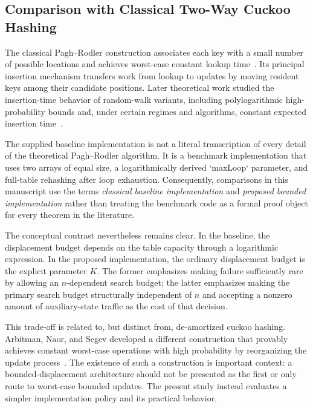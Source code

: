 \documentclass[conference]{IEEEtran}
\begin{document}
\subsection{Comparison with Classical Two-Way Cuckoo Hashing}

The classical Pagh--Rodler construction associates each key with a small number of possible locations and achieves worst-case constant lookup time~\cite{pagh2004cuckoo}. Its principal insertion mechanism transfers work from lookup to updates by moving resident keys among their candidate positions. Later theoretical work studied the insertion-time behavior of random-walk variants, including polylogarithmic high-probability bounds and, under certain regimes and algorithms, constant expected insertion time~\cite{fountoulakis2010insertion,walzer2022insertion,bell2024constant}.

The supplied baseline implementation is not a literal transcription of every detail of the theoretical Pagh--Rodler algorithm. It is a benchmark implementation that uses two arrays of equal size, a logarithmically derived `maxLoop` parameter, and full-table rehashing after loop exhaustion. Consequently, comparisons in this manuscript use the terms \emph{classical baseline implementation} and \emph{proposed bounded implementation} rather than treating the benchmark code as a formal proof object for every theorem in the literature.

The conceptual contrast nevertheless remains clear. In the baseline, the displacement budget depends on the table capacity through a logarithmic expression. In the proposed implementation, the ordinary displacement budget is the explicit parameter $K$. The former emphasizes making failure sufficiently rare by allowing an $n$-dependent search budget; the latter emphasizes making the primary search budget structurally independent of $n$ and accepting a nonzero amount of auxiliary-state traffic as the cost of that decision.

This trade-off is related to, but distinct from, de-amortized cuckoo hashing. Arbitman, Naor, and Segev developed a different construction that provably achieves constant worst-case operations with high probability by reorganizing the update process~\cite{arbitman2009deamortized}. The existence of such a construction is important context: a bounded-displacement architecture should not be presented as the first or only route to worst-case bounded updates. The present study instead evaluates a simpler implementation policy and its practical behavior.
\end{document}
